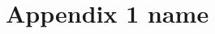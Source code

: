 \renewcommand\thesection{A\arabic{section}}
\renewcommand\thesubsection{A\thesection.\arabic{subsection}}


\section{Appendix 1 name}
